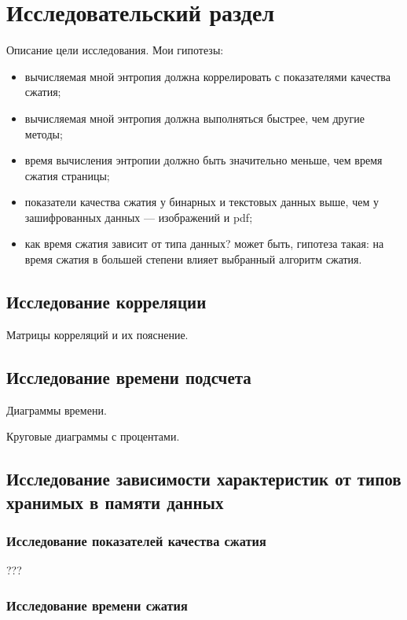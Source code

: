 \chapter{Исследовательский раздел}

Описание цели исследования. Мои гипотезы:

\begin{itemize}
    \item вычисляемая мной энтропия должна коррелировать с показателями качества сжатия;
    \item вычисляемая мной энтропия должна выполняться быстрее, чем другие методы;
    \item время вычисления энтропии должно быть значительно меньше, чем время сжатия страницы;
    \item показатели качества сжатия у бинарных и текстовых данных выше, чем у зашифрованных данных --- изображений и pdf;
    \item как время сжатия зависит от типа данных? может быть, гипотеза такая: на время сжатия в большей степени влияет выбранный алгоритм сжатия.
\end{itemize}

\section{Исследование корреляции}

Матрицы корреляций и их пояснение.

\section{Исследование времени подсчета}

Диаграммы времени.

Круговые диаграммы с процентами.

\section{Исследование зависимости характеристик от типов хранимых в памяти данных}

\subsection{Исследование показателей качества сжатия}

???

\subsection{Исследование времени сжатия}

